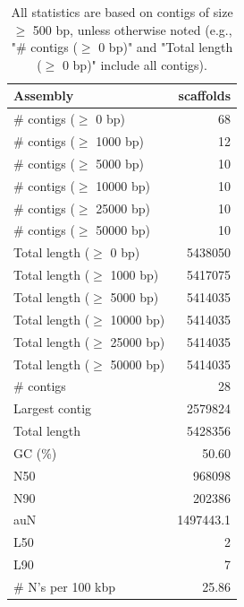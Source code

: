 \documentclass[12pt,a4paper]{article}
\begin{document}
\begin{table}[ht]
\begin{center}
\caption{All statistics are based on contigs of size $\geq$ 500 bp, unless otherwise noted (e.g., "\# contigs ($\geq$ 0 bp)" and "Total length ($\geq$ 0 bp)" include all contigs).}
\begin{tabular}{|l*{1}{|r}|}
\hline
Assembly & scaffolds \\ \hline
\# contigs ($\geq$ 0 bp) & 68 \\ \hline
\# contigs ($\geq$ 1000 bp) & 12 \\ \hline
\# contigs ($\geq$ 5000 bp) & 10 \\ \hline
\# contigs ($\geq$ 10000 bp) & 10 \\ \hline
\# contigs ($\geq$ 25000 bp) & 10 \\ \hline
\# contigs ($\geq$ 50000 bp) & 10 \\ \hline
Total length ($\geq$ 0 bp) & 5438050 \\ \hline
Total length ($\geq$ 1000 bp) & 5417075 \\ \hline
Total length ($\geq$ 5000 bp) & 5414035 \\ \hline
Total length ($\geq$ 10000 bp) & 5414035 \\ \hline
Total length ($\geq$ 25000 bp) & 5414035 \\ \hline
Total length ($\geq$ 50000 bp) & 5414035 \\ \hline
\# contigs & 28 \\ \hline
Largest contig & 2579824 \\ \hline
Total length & 5428356 \\ \hline
GC (\%) & 50.60 \\ \hline
N50 & 968098 \\ \hline
N90 & 202386 \\ \hline
auN & 1497443.1 \\ \hline
L50 & 2 \\ \hline
L90 & 7 \\ \hline
\# N's per 100 kbp & 25.86 \\ \hline
\end{tabular}
\end{center}
\end{table}
\end{document}
